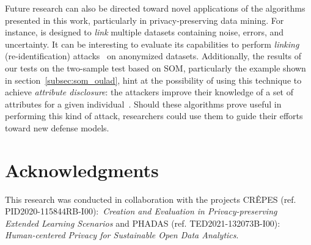 Future research can also be directed toward novel applications of the algorithms presented in this work,
particularly in privacy-preserving data mining.
For instance, \PresQ is designed to \emph{link} multiple datasets containing noise, errors, and uncertainty.
It can be interesting to evaluate its capabilities to perform \emph{linking} (re-identification)
attacks~\cite{Chen2009} on anonymized datasets. Additionally, the results of our tests on the
two-sample test based on \gls{SOM}, particularly the example shown in section~\ref{subsec:som_oulad},
 hint at the possibility of using this technique to achieve \emph{attribute disclosure}:
 the attackers improve their knowledge of a set of attributes for a given individual~\cite{ENISA2015}.
Should these algorithms prove useful in performing this kind of attack, researchers could
use them to guide their efforts toward new defense models.


\section*{Acknowledgments}

This research was conducted in collaboration with the projects
CR\^EPES (ref. PID2020-115844RB-I00): \textit{Creation and Evaluation in Privacy-preserving Extended Learning Scenarios}
and PHADAS (ref. TED2021-132073B-I00): \textit{Human-centered Privacy for Sustainable Open Data Analytics}.
